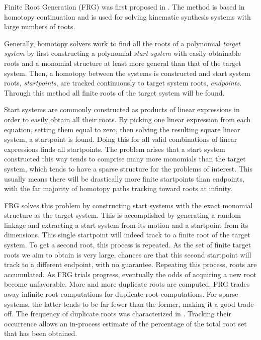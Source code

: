 \documentclass[journal]{IEEEtran}
\begin{document}
Finite Root Generation (FRG) was first proposed in \cite{plecnikFindingOnlyFinite2017}.
The method is based in homotopy continuation and is used for solving kinematic synthesis systems with large numbers of roots.

Generally, homotopy solvers work to find all the roots of a polynomial \emph{target system} by first constructing a polynomial \emph{start system} with easily obtainable roots and a monomial structure at least more general than that of the target system.
Then, a homotopy between the systems is constructed and start system roots, \emph{startpoints}, are tracked continuously to target system roots, \emph{endpoints}.
Through this method all finite roots of the target system will be found.

Start systems are commonly constructed as products of linear expressions in order to easily obtain all their roots.
By picking one linear expression from each equation, setting them equal to zero, then solving the resulting square linear system, a startpoint is found.  
Doing this for all valid combinations of linear expressions finds all startpoints.
The problem arises that a start system constructed this way tends to comprise many more monomials than the target system, which tends to have a sparse structure for the problems of interest.
This usually means there will be drastically more finite startpoints than endpoints, with the far majority of homotopy paths tracking toward roots at infinity.


FRG solves this problem by constructing start systems with the exact monomial structure as the target system.
This is accomplished by generating a random linkage and extracting a start system from its motion and a startpoint from its dimensions.
This single startpoint will indeed track to a finite root of the target system.
To get a second root, this process is repeated.
As the set of finite target roots we aim to obtain is very large, chances are that this second startpoint will track to a different endpoint, with no guarantee.
Repeating this process, roots are accumulated.
As FRG trials progress, eventually the odds of acquiring a new root become unfavorable.
More and more duplicate roots are computed.
FRG trades away infinite root computations for duplicate root computations.  
For sparse systems, the latter tends to be far fewer than the former, making it a good trade-off.
The frequency of duplicate roots was characterized in \cite{plecnikStudyFindingFinite2017}.
Tracking their occurrence allows an in-process estimate of the percentage of the total root set that has been obtained.
\end{document}
